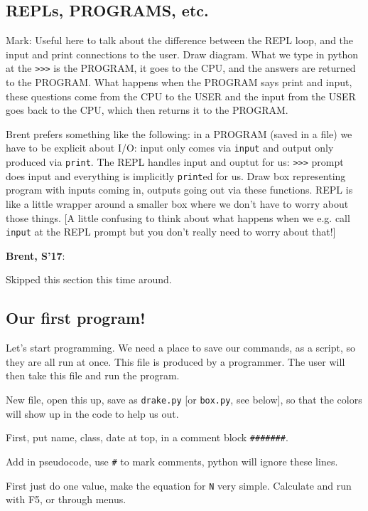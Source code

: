\documentclass{article}
\newenvironment{reflect}[1]
{
  \noindent
  \begin{lrbox}{\reflectbox}
    \begin{minipage}[t]{\textwidth}
      \textbf{#1}:
}{
    \end{minipage}
  \end{lrbox}
  \fbox{\usebox{\reflectbox}}
}
\begin{document}
\subsection*{REPLs, PROGRAMS, etc.}

Mark: Useful here to talk about the difference between the REPL loop,
and the input and print connections to the user. Draw diagram. What we
type in python at the \verb|>>>| is the PROGRAM, it goes to the CPU,
and the answers are returned to the PROGRAM. What happens when the
PROGRAM says print and input, these questions come from the CPU to the
USER and the input from the USER goes back to the CPU, which then
returns it to the PROGRAM.

Brent prefers something like the following: in a PROGRAM (saved in a
file) we have to be explicit about I/O: input only comes via
\verb|input| and output only produced via \verb|print|.  The REPL
handles input and ouptut for us: \verb|>>>| prompt does input and
everything is implicitly \verb|print|ed for us.  Draw box representing
program with inputs coming in, outputs going out via these functions.
REPL is like a little wrapper around a smaller box where we don't have
to worry about those things.  [A little confusing to think about what
happens when we e.g. call \verb|input| at the REPL prompt but you
don't really need to worry about that!]

\begin{reflect}{Brent, S'17}
Skipped this section this time around.
\end{reflect}

\subsection*{Our first program!}

Let's start programming.  We need a place to save our commands, as a
script, so they are all run at once.  This file is produced by a
programmer.  The user will then take this file and run the program.

New file, open this up, save as \verb|drake.py| [or \verb|box.py|, see
below], so
that the colors will show up in the code to help us out.

First, put name, class, date at top, in a comment block \verb|#######|.

Add in pseudocode, use \verb|#| to mark comments, python will ignore
these lines.

First just do one value, make the equation for \verb|N| very simple.
Calculate and run with F5, or through menus.
\end{document}
